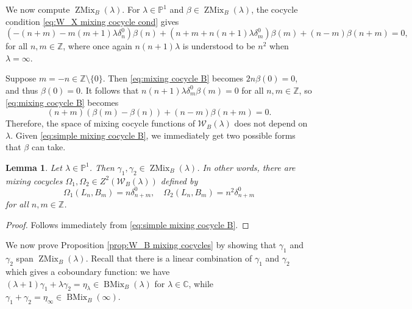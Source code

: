 \documentclass[11pt, svgnames]{amsart}
\newcommand{\ZZ}{\mathbb{Z}}
\newcommand{\CC}{\mathbb{C}}
\newcommand{\PP}{\mathbb{P}}
\newcommand{\W}{\mathcal{W}}
\DeclareMathOperator{\ZMix}{ZMix}
\DeclareMathOperator{\BMix}{BMix}
\newcommand{\nonzero}{\setminus \{0\}}
\newtheorem{lemma}[proposition]{Lemma}
\theoremstyle{definition}
\begin{document}
We now compute $\ZMix_B(\lambda)$. For $\lambda \in \PP^1$ and $\beta \in \ZMix_B(\lambda)$, the cocycle condition \eqref{eq:W_X mixing cocycle cond} gives
\begin{equation}\label{eq:mixing cocycle B}
    (-(n + m) - m(m + 1)\lambda \delta_n^0)\beta(n) + (n + m + n(n + 1)\lambda \delta_m^0)\beta(m) + (n - m)\beta(n + m) = 0,
\end{equation}
for all $n,m \in \ZZ$, where once again $n(n + 1)\lambda$ is understood to be $n^2$ when $\lambda = \infty$.

Suppose $m = -n \in \ZZ \nonzero$. Then \eqref{eq:mixing cocycle B} becomes $2n\beta(0) = 0$, and thus $\beta(0) = 0$. It follows that $n(n + 1)\lambda \delta_m^0 \beta(m) = 0$ for all $n,m \in \ZZ$, so \eqref{eq:mixing cocycle B} becomes
\begin{equation}\label{eq:simple mixing cocycle B}
    (n + m)(\beta(m) - \beta(n)) + (n - m)\beta(n + m) = 0.
\end{equation}
Therefore, the space of mixing cocycle functions of $\W_B(\lambda)$ does not depend on $\lambda$. Given \eqref{eq:simple mixing cocycle B}, we immediately get two possible forms that $\beta$ can take.

\begin{lemma}\label{lem:obvious cocycles B}
    Let $\lambda \in \PP^1$. Then $\gamma_1, \gamma_2 \in \ZMix_B(\lambda)$. In other words, there are mixing cocycles $\Omega_1, \Omega_2 \in Z^2(\W_B(\lambda))$ defined by
    $$\Omega_1(L_n,B_m) = n\delta_{n+m}^0, \quad \Omega_2(L_n,B_m) = n^2\delta_{n+m}^0$$
    for all $n,m \in \ZZ$.
\end{lemma}
\begin{proof}
    Follows immediately from \eqref{eq:simple mixing cocycle B}.
\end{proof}

We now prove Proposition \ref{prop:W_B mixing cocycles} by showing that $\gamma_1$ and $\gamma_2$ span $\ZMix_B(\lambda)$. Recall that there is a linear combination of $\gamma_1$ and $\gamma_2$ which gives a coboundary function: we have $(\lambda + 1)\gamma_1 + \lambda \gamma_2 = \eta_\lambda \in \BMix_B(\lambda)$ for $\lambda \in \CC$, while $\gamma_1 + \gamma_2 = \eta_\infty \in \BMix_B(\infty)$.
\end{document}
